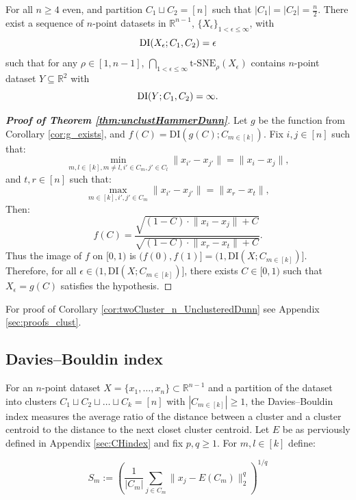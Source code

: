 \begin{corollary}
\label{cor:twoCluster_n_UnclusteredDunn}
    For all $n \geq 4$ even, and partition $C_1 \sqcup C_2 = [n]$ such that $|C_1|=|C_2|=\frac{n}{2}$. There exist a sequence of $n$-point datasets in $\mathbb{R}^{n-1}$, $\{ {X}_\epsilon\}_{1 < \epsilon \leq \infty}$, with 
        $$\textup{DI}({X}_\epsilon; C_1, C_2) = \epsilon$$
    such that for any $\rho \in [1, n-1]$, $\bigcap_{1<\epsilon \leq \infty}\text{t-SNE}_\rho({X}_\epsilon)$ contains $n$-point dataset ${Y} \subseteq \mathbb{R}^2$ with
    $$\textup{DI}(Y; C_1,C_2) = \infty.$$ 
\end{corollary}

\begin{proof}[\textbf{Proof of Theorem \ref{thm:unclustHammerDunn}}]
    Let $g$ be the function from Corollary \ref{cor:g_exists}, and $f(C) = \text{DI}(g(C); C_{m \in [k]}).$ Fix $i,j \in [n]$ such that:
    $$\min_{m,l \in [k], m\neq l, i' \in C_m, j' \in C_l} \lVert x_{i'} - x_{j'} \rVert = \lVert x_i - x_j \rVert,$$
    and $t,r \in [n]$ such that:
    $$\max_{m \in [k], i',j' \in C_m} \lVert x_{i'} - x_{j'} \rVert = \lVert x_{r} - x_{t} \rVert,$$
    Then:
    $$f(C) = \frac{ \sqrt{(1-C)\cdot\lVert x_i - x_j \rVert+C}}{ \sqrt{(1-C)\cdot\lVert x_r - x_t \rVert+C}}.$$
    Thus the image of $f$ on $[0,1)$ is $(f(0), f(1)] = (1, \text{DI}(X; C_{m \in [k]})]$. Therefore, for all $\epsilon \in (1,\text{DI}(X; C_{m \in [k]})]$, there exists $C \in [0,1)$ such that $X_\epsilon = g(C)$ satisfies the hypothesis.
\end{proof}

For proof of Corollary \ref{cor:twoCluster_n_UnclusteredDunn} see Appendix \ref{sec:proofs_clust}.

\iffalse
\subsection{Davies–Bouldin index}
For an $n$-point dataset $X = \{x_1, \dots, x_n\} \subset \mathbb{R}^{n-1}$ and a partition of the dataset into clusters $C_1 \sqcup C_2 \sqcup \dots \sqcup C_k = [n]$ with $|C_{m\in[k]}| \geq 1$, the Davies–Bouldin index measures the average ratio of the distance between a cluster and a cluster centroid to the distance to the next closet cluster centroid. Let $E$ be as perviously defined in Appendix \ref{sec:CHindex} and fix $p,q \geq 1$. For $m,l \in [k]$ define:

$$S_m := \left( \frac{1}{|C_m|} \sum_{j \in C_m} \lVert x_j - E(C_m) \rVert_2^q\right)^{1/q}$$

